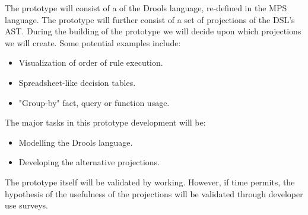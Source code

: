 The prototype will consist of a of the Drools language, re-defined in the MPS language.  
The prototype will further consist of a set of projections of the DSL's AST.
During the building of the prototype we will decide upon which projections we will create. Some potential examples include:
\begin{itemize}
    \item Visualization of order of rule execution.
    \item Spreadsheet-like decision tables.
    \item "Group-by" fact, query or function usage.
\end{itemize}


The major tasks in this prototype development will be: 
\begin{itemize}
    \item Modelling the Drools language.
    \item Developing the alternative projections.
\end{itemize}

The prototype itself will be validated by working.
However, if time permits, the hypothesis of the usefulness of the projections will be validated through developer use surveys.

